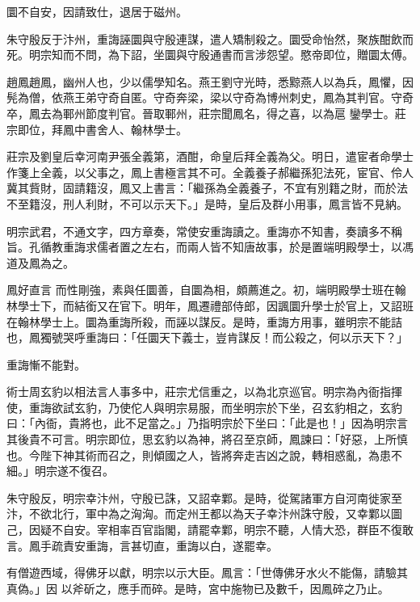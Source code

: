 \begin{pinyinscope}
 圜不自安，因請致仕，退居于磁州。



 朱守殷反于汴州，重誨誣圜與守殷連謀，遣人矯制殺之。圜受命怡然，聚族酣飲而死。明宗知而不問，為下詔，坐圜與守殷通書而言涉怨望。愍帝即位，贈圜太傅。



 趙鳳趙鳳，幽州人也，少以儒學知名。燕王劉守光時，悉黥燕人以為兵，鳳懼，因髡為僧，依燕王弟守奇自匿。守奇奔梁，梁以守奇為博州刺史，鳳為其判官。守奇卒，鳳去為鄆州節度判官。晉取鄆州，莊宗聞鳳名，得之喜，以為扈
 鑾學士。莊宗即位，拜鳳中書舍人、翰林學士。



 莊宗及劉皇后幸河南尹張全義第，酒酣，命皇后拜全義為父。明日，遣宦者命學士作箋上全義，以父事之，鳳上書極言其不可。全義養子郝繼孫犯法死，宦官、伶人冀其貲財，固請籍沒，鳳又上書言：「繼孫為全義養子，不宜有別籍之財，而於法不至籍沒，刑人利財，不可以示天下。」是時，皇后及群小用事，鳳言皆不見納。



 明宗武君，不通文字，四方章奏，常使安重誨讀之。重誨亦不知書，奏讀多不稱旨。孔循教重誨求儒者置之左右，而兩人皆不知唐故事，於是置端明殿學士，以馮道及鳳為之。



 鳳好直言
 而性剛強，素與任圜善，自圜為相，頗薦進之。初，端明殿學士班在翰林學士下，而結銜又在官下。明年，鳳遷禮部侍郎，因諷圜升學士於官上，又詔班在翰林學士上。圜為重誨所殺，而誣以謀反。是時，重誨方用事，雖明宗不能詰也，鳳獨號哭呼重誨曰：「任圜天下義士，豈肯謀反！而公殺之，何以示天下？」



 重誨慚不能對。



 術士周玄豹以相法言人事多中，莊宗尤信重之，以為北京巡官。明宗為內衙指揮使，重誨欲試玄豹，乃使佗人與明宗易服，而坐明宗於下坐，召玄豹相之，玄豹曰：「內衙，貴將也，此不足當之。」乃指明宗於下坐曰：「此是也！」因為明宗言
 其後貴不可言。明宗即位，思玄豹以為神，將召至京師，鳳諫曰：「好惡，上所慎也。今陛下神其術而召之，則傾國之人，皆將奔走吉凶之說，轉相惑亂，為患不細。」明宗遂不復召。



 朱守殷反，明宗幸汴州，守殷已誅，又詔幸鄴。是時，從駕諸軍方自河南徙家至汴，不欲北行，軍中為之洶洶。而定州王都以為天子幸汴州誅守殷，又幸鄴以圖己，因疑不自安。宰相率百官詣閣，請罷幸鄴，明宗不聽，人情大恐，群臣不復敢言。鳳手疏責安重誨，言甚切直，重誨以白，遂罷幸。



 有僧遊西域，得佛牙以獻，明宗以示大臣。鳳言：「世傳佛牙水火不能傷，請驗其真偽。」因
 以斧斫之，應手而碎。是時，宮中施物已及數千，因鳳碎之乃止。




\end{pinyinscope}
